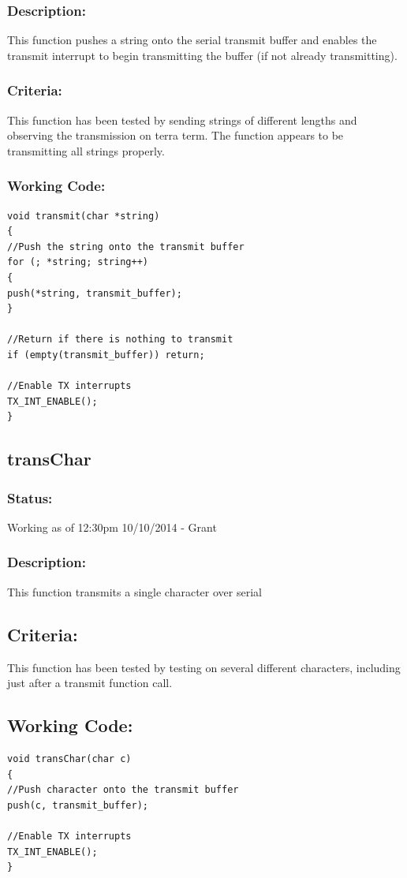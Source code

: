\documentclass[]{report}
\begin{document}
\subsubsection{Description:}
This function pushes a string onto the serial transmit buffer and enables the transmit interrupt to begin transmitting the buffer (if not already transmitting).

\subsubsection{Criteria:}
This function has been tested by sending strings of different lengths and observing the transmission on terra term. The function appears to be transmitting all strings properly.

\subsubsection{Working Code:}
\begin{lstlisting}
void transmit(char *string)
{
//Push the string onto the transmit buffer
for (; *string; string++)
{
push(*string, transmit_buffer);
}

//Return if there is nothing to transmit
if (empty(transmit_buffer)) return;

//Enable TX interrupts
TX_INT_ENABLE();
}
\end{lstlisting}

\subsection{transChar}
\subsubsection{Status:}
Working as of 12:30pm 10/10/2014 - Grant

\subsubsection{Description:}
This function transmits a single character over serial

\subsection{Criteria:}
This function has been tested by testing on several different characters,  including just after a transmit function call.

\subsection{Working Code:}
\begin{lstlisting}
void transChar(char c)
{
//Push character onto the transmit buffer
push(c, transmit_buffer);

//Enable TX interrupts
TX_INT_ENABLE();
}
\end{lstlisting}
\end{document}
